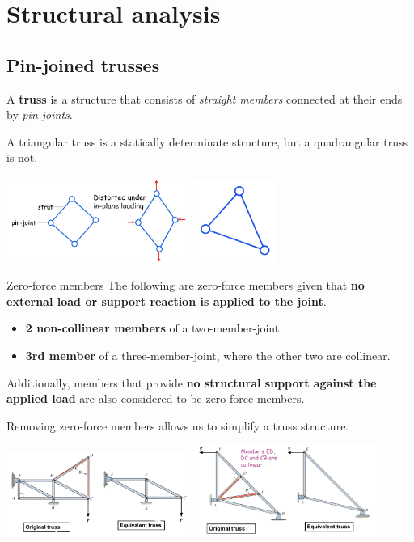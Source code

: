 \section{Structural analysis}
\subsection{Pin-joined trusses}
A \textbf{truss} is a structure that consists of \emph{straight members} connected at their ends by \emph{pin joints}.

A triangular truss is a statically determinate structure, but a quadrangular truss is not.
\begin{center}
    \includegraphics[width=0.45\textwidth]{./img/quadtruss.png}
    \includegraphics[width=0.2\textwidth]{./img/tritruss.png}
\end{center}
\begin{theorem}
    {Zero-force members}
    The following are zero-force members given that \textbf{no external load or support reaction is applied to the joint}.
    \begin{itemize}
        \item \textbf{2 non-collinear members} of a two-member-joint
        \item \textbf{3rd member} of a three-member-joint, where the other two are collinear.
    \end{itemize}
    Additionally, members that provide \textbf{no structural support against the applied load} are also considered to be zero-force members.

    Removing zero-force members allows us to simplify a truss structure.
    \tcblower
    \begin{center}
        \includegraphics[width=0.45\textwidth]{./img/zero2.jpg}
        \includegraphics[width=0.45\textwidth]{./img/zero3.jpg}
    \end{center}
\end{theorem}

